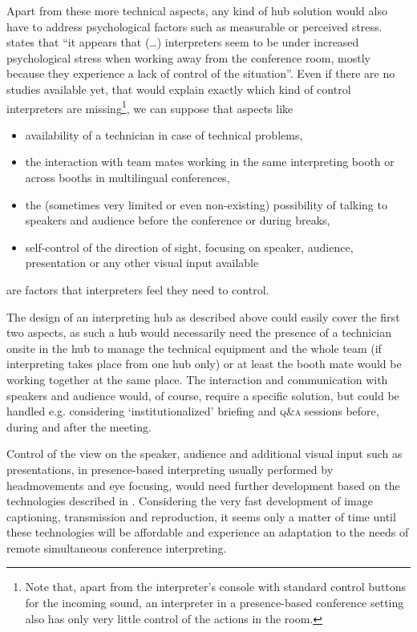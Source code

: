 \documentclass[output=paper]{langsci/langscibook}
\begin{document}
Apart from these more technical aspects, any kind of hub solution would also have to address psychological factors such as measurable or perceived stress. \citet[15]{Moser-Mercer2005} states that “it appears that (…) interpreters seem to be under increased psychological stress when working away from the conference room, mostly because they experience a lack of control of the situation”. Even if there are no studies available yet, that would explain exactly which kind of control interpreters are missing\footnote{Note that, apart from the interpreter’s console with standard control buttons for the incoming sound, an interpreter in a presence-based conference setting also has only very little control of the actions in the room.}, we can suppose that aspects like

\begin{itemize}
\item availability of a technician in case of technical problems,
\item the interaction with team mates working in the same interpreting booth or across booths in multilingual conferences,
\item the (sometimes very limited or even non-existing) possibility of talking to speakers and audience before the conference or during breaks,
\item self-control of the direction of sight, focusing on speaker, audience, presentation or any other visual input available
\end{itemize}

are factors that interpreters feel they need to control.

The design of an interpreting hub as described above could easily cover the first two aspects, as such a hub would necessarily need the presence of a technician onsite in the hub to manage the technical equipment and the whole team (if interpreting takes place from one hub only) or at least the booth mate would be working together at the same place. 
The interaction and communication with speakers and audience would, of course, require a specific solution, but could be handled e.g. considering ‘institutionalized’ briefing and \textsc{q\&a} sessions before, during and after the meeting.

Control of the view on the speaker, audience and additional visual input such as presentations, in presence-based interpreting usually performed by head\linebreak movements and eye focusing, would need further development based on the technologies described in . Considering the very fast development of image captioning, transmission and reproduction, it seems only a matter of time until these technologies will be affordable and experience an adaptation to the needs of remote simultaneous conference interpreting. 
\end{document}

